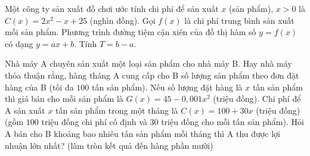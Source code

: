 \begin{ex}%
	Một công ty sản xuất đồ chơi ước tính chi phí để sản xuất $x$ (sản phẩm), $x>0$ là $C(x)=2x^2-x+25$ (nghìn đồng). Gọi $f(x)$ là chi phí trung bình sản xuất mỗi sản phẩm. Phương trình đường tiệm cận xiên của đồ thị hàm số $y=f(x)$ có dạng $y=ax+b$. Tính $T=b-a$.
\end{ex}

\begin{ex}%
	Nhà máy A chuyên sản xuất một loại sản phẩm cho nhà máy B. Hay nhà máy thỏa thuận rằng, hàng tháng A cung cấp cho B số lượng sản phẩm theo đơn đặt hàng của B (tối đa $100$ tấn sản phẩm). Nếu số lượng đặt hàng là $x$ tấn sản phẩm thì giá bán cho mỗi sản phẩm là $G(x)=45-0{,}001x^2$ (triệu đồng). Chi phí để A sản xuất $x$ tấn sản phẩm trong một tháng là $C(x)=100+30x$ (triệu đồng) (gồm $100$ triệu đồng chi phí cố định và $30$ triệu đồng cho mỗi tấn sản phẩm). Hỏi A bán cho B khoảng bao nhiêu tấn sản phẩm mỗi tháng thì A thu được lợi nhuận lớn nhất? (làm tròn kết quả đến hàng phần mười)
\end{ex}

